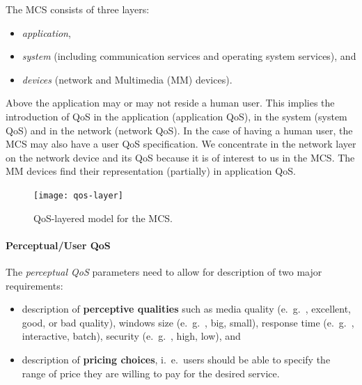 The MCS consists of three layers: 
\begin{itemize}
	\item \textit{application}, 
	\item \textit{system} (including communication services and operating system services), and 
	\item \textit{devices} (network and Multimedia (MM) devices). 
\end{itemize}

Above the application may or may not reside a human user. This implies the introduction of QoS in the application (application QoS), in the system (system QoS) and in the network (network QoS). In the case of having a human user, the MCS may also have a user QoS specification. We concentrate in the network layer on the network device and its QoS because it is of interest to us in the MCS. The MM devices find their representation (partially) in application QoS. 

\begin{figure}[pht]
	\centering
	\texttt{[image: qos-layer]}
	\caption{QoS-layered model for the MCS.}\label{fig:qos-layer}
\end{figure}

\paragraph*{Perceptual/User QoS} 
The \textit{perceptual QoS} parameters need to allow for description of two major requirements:
\begin{itemize}
	\item description of \textbf{perceptive qualities} such as media quality (e.\ g.\ ,	excellent, good, or bad quality), windows size (e.\ g.\ , big, small), response time (e.\ g.\ , interactive, batch), security (e.\ g.\ , high, low), and 
	\item description of \textbf{pricing choices}, i.\ e.\, users should be able to specify the range of price they are willing to pay for the desired	service.
\end{itemize}

